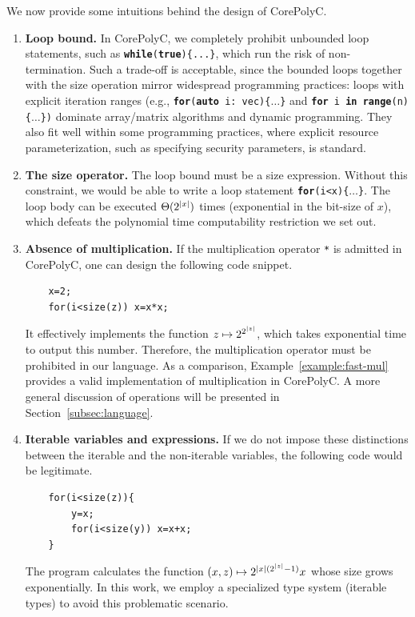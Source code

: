 \documentclass[runningheads]{llncs}
\begin{document}
\begin{remark}
    We now provide some intuitions behind the design of CorePolyC.
\begin{enumerate}
    \item \textbf{Loop bound.}
    In CorePolyC, we completely prohibit unbounded loop statements, such as \texttt{\textbf{while}(\textbf{true})\{...\}}, which run the risk of non-termination.
    Such a trade-off is acceptable, since the bounded loops together with the size operation mirror widespread programming practices: loops with explicit iteration ranges (e.g., \texttt{\textbf{for}(\textbf{auto} i: vec)\{$\dots$\}} and \texttt{\textbf{for} i \textbf{in} \textbf{range}(n)\{$\dots$\})} dominate array/matrix algorithms and dynamic programming. 
    They also fit well within some programming practices, where explicit resource parameterization, such as specifying security parameters, is standard.
    \item \textbf{The size operator.}
    The loop bound must be a size expression.
    Without this constraint, we would be able to write a loop statement \texttt{\textbf{for}(i<x)\{$\dots$\}}.
    The loop body can be executed $\Theta(2^{\vert x\vert})$ times (exponential in the bit-size of $x$), which defeats the polynomial time computability restriction we set out.
    \item \textbf{Absence of multiplication.}
    If the multiplication operator \texttt{*} is admitted in CorePolyC, one can design the following code snippet.
    \begin{lstlisting}
    x=2;
    for(i<size(z)) x=x*x;
    \end{lstlisting}
    It effectively implements the function $z\mapsto 2^{2^{\vert z\vert}}$, which takes exponential time to output this number.
    Therefore, the multiplication operator must be prohibited in our language.
    As a comparison, Example~\ref{example:fast-mul} provides a valid implementation of multiplication in CorePolyC. 
    A more general discussion of operations will be presented in Section~\ref{subsec:language}.
    
    \item \textbf{Iterable variables and expressions.}
    If we do not impose these distinctions between the iterable and the non-iterable variables, the following code would be legitimate.
    \begin{lstlisting}
    for(i<size(z)){
        y=x;
        for(i<size(y)) x=x+x;
    }
    \end{lstlisting}
    The program calculates the function $(x,z) \mapsto 2^{\vert x\vert(2^{\vert z\vert}-1)} x$ whose size grows exponentially.
    In this work, we employ a specialized type system (iterable types) to avoid this problematic scenario.
\end{enumerate}
\end{remark}
\end{document}
